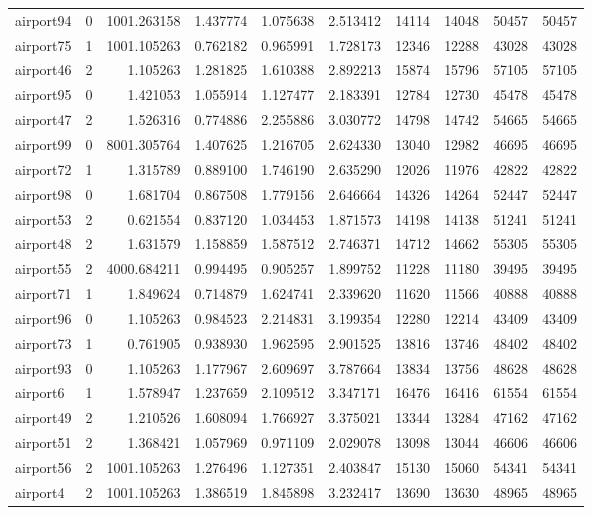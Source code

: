 \begin{longtable}{|l|r|r|r|r|r|r|r|r|r|}
airport94 & 0 & 1001.263158 & 1.437774 & 1.075638 & 2.513412 & 14114 & 14048 & 50457 & 50457 \\
airport75 & 1 & 1001.105263 & 0.762182 & 0.965991 & 1.728173 & 12346 & 12288 & 43028 & 43028 \\
airport46 & 2 & 1.105263 & 1.281825 & 1.610388 & 2.892213 & 15874 & 15796 & 57105 & 57105 \\
airport95 & 0 & 1.421053 & 1.055914 & 1.127477 & 2.183391 & 12784 & 12730 & 45478 & 45478 \\
airport47 & 2 & 1.526316 & 0.774886 & 2.255886 & 3.030772 & 14798 & 14742 & 54665 & 54665 \\
airport99 & 0 & 8001.305764 & 1.407625 & 1.216705 & 2.624330 & 13040 & 12982 & 46695 & 46695 \\
airport72 & 1 & 1.315789 & 0.889100 & 1.746190 & 2.635290 & 12026 & 11976 & 42822 & 42822 \\
airport98 & 0 & 1.681704 & 0.867508 & 1.779156 & 2.646664 & 14326 & 14264 & 52447 & 52447 \\
airport53 & 2 & 0.621554 & 0.837120 & 1.034453 & 1.871573 & 14198 & 14138 & 51241 & 51241 \\
airport48 & 2 & 1.631579 & 1.158859 & 1.587512 & 2.746371 & 14712 & 14662 & 55305 & 55305 \\
airport55 & 2 & 4000.684211 & 0.994495 & 0.905257 & 1.899752 & 11228 & 11180 & 39495 & 39495 \\
airport71 & 1 & 1.849624 & 0.714879 & 1.624741 & 2.339620 & 11620 & 11566 & 40888 & 40888 \\
airport96 & 0 & 1.105263 & 0.984523 & 2.214831 & 3.199354 & 12280 & 12214 & 43409 & 43409 \\
airport73 & 1 & 0.761905 & 0.938930 & 1.962595 & 2.901525 & 13816 & 13746 & 48402 & 48402 \\
airport93 & 0 & 1.105263 & 1.177967 & 2.609697 & 3.787664 & 13834 & 13756 & 48628 & 48628 \\
airport6 & 1 & 1.578947 & 1.237659 & 2.109512 & 3.347171 & 16476 & 16416 & 61554 & 61554 \\
airport49 & 2 & 1.210526 & 1.608094 & 1.766927 & 3.375021 & 13344 & 13284 & 47162 & 47162 \\
airport51 & 2 & 1.368421 & 1.057969 & 0.971109 & 2.029078 & 13098 & 13044 & 46606 & 46606 \\
airport56 & 2 & 1001.105263 & 1.276496 & 1.127351 & 2.403847 & 15130 & 15060 & 54341 & 54341 \\
airport4 & 2 & 1001.105263 & 1.386519 & 1.845898 & 3.232417 & 13690 & 13630 & 48965 & 48965 \\

\end{longtable}
